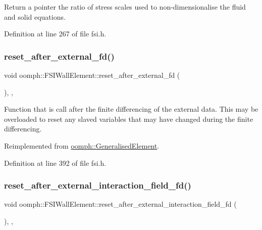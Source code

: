 Return a pointer the ratio of stress scales used to non-\/dimensionalise the fluid and solid equations. 



Definition at line 267 of file fsi.\+h.

\mbox{\label{classoomph_1_1FSIWallElement_a2b1dc28716968b01e7bf5513ea4446c5}} 
\subsubsection{\texorpdfstring{reset\+\_\+after\+\_\+external\+\_\+fd()}{reset\_after\_external\_fd()}}
{\footnotesize\ttfamily void oomph\+::\+F\+S\+I\+Wall\+Element\+::reset\+\_\+after\+\_\+external\+\_\+fd (\begin{DoxyParamCaption}{ }\end{DoxyParamCaption})\hspace{0.3cm}{\ttfamily [inline]}, {\ttfamily [protected]}, {\ttfamily [virtual]}}



Function that is call after the finite differencing of the external data. This may be overloaded to reset any slaved variables that may have changed during the finite differencing. 



Reimplemented from \hyperlink{classoomph_1_1GeneralisedElement_a10210277ae4fa66b7701ff00d4dd9b14}{oomph\+::\+Generalised\+Element}.



Definition at line 392 of file fsi.\+h.

\mbox{\label{classoomph_1_1FSIWallElement_a5ba540936e15a03aef43bddd4d5b3f33}} 
\subsubsection{\texorpdfstring{reset\+\_\+after\+\_\+external\+\_\+interaction\+\_\+field\+\_\+fd()}{reset\_after\_external\_interaction\_field\_fd()}}
{\footnotesize\ttfamily void oomph\+::\+F\+S\+I\+Wall\+Element\+::reset\+\_\+after\+\_\+external\+\_\+interaction\+\_\+field\+\_\+fd (\begin{DoxyParamCaption}{ }\end{DoxyParamCaption})\hspace{0.3cm}{\ttfamily [inline]}, {\ttfamily [protected]}, {\ttfamily [virtual]}}



